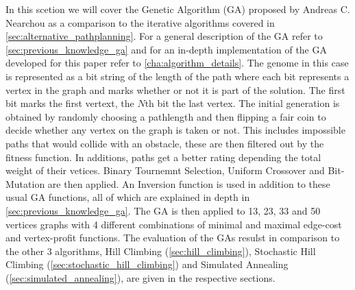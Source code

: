 In this scetion we will cover the Genetic Algorithm (GA) proposed by Andreas C. Nearchou \cite{8} as a comparison to the iterative algorithms covered in \ref{sec:alternative_pathplanning}. For a general description of the GA refer to \ref{sec:previous_knowledge_ga} and for an in-depth implementation of the GA developed for this paper refer to \ref{cha:algorithm_details}.
The genome in this case is represented as a bit string of the length of the path where each bit represents a vertex in the graph and marks whether or not it is part of the solution. The first bit marks the first vertext, the $N$th bit the last vertex. The initial generation is obtained by randomly choosing a pathlength and then flipping a fair coin to decide whether any vertex on the graph is taken or not. This includes impossible paths that would collide with an obstacle, these are then filtered out by the fitness function. In additions, paths get a better rating depending the total weight of their vetices. Binary Tournemnt Selection, Uniform Crossover and Bit-Mutation are then applied. An Inversion function is used in addition to these usual GA functions, all of which are explained in depth in \ref{sec:previous_knowledge_ga}.
The GA is then applied to 13, 23, 33 and 50 vertices graphs with 4 different combinations of minimal and maximal edge-cost and vertex-profit functions. The evaluation of the GAs resulst in comparison to the other 3 algorithms, Hill Climbing (\ref{sec:hill_climbing}), Stochastic Hill Climbing (\ref{sec:stochastic_hill_climbing}) and Simulated Annealing (\ref{sec:simulated_annealing}), are given in the respective sections.


